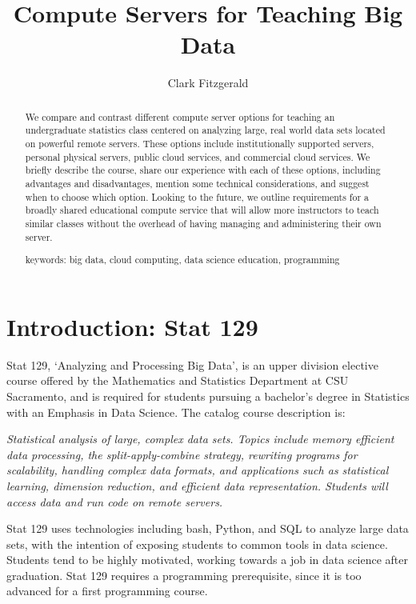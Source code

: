 \documentclass[12pt]{article}
\title{Compute Servers for Teaching Big Data}
\author{Clark Fitzgerald}
\begin{document}
\maketitle

\begin{abstract}

    We compare and contrast different compute server options for teaching an undergraduate statistics class centered on analyzing large, real world data sets located on powerful remote servers.
These options include institutionally supported servers, personal physical servers, public cloud services, and commercial cloud services.
We briefly describe the course, share our experience with each of these options, including advantages and disadvantages, mention some technical considerations, and suggest when to choose which option.
Looking to the future, we outline requirements for a broadly shared educational compute service that will allow more instructors to teach similar classes without the overhead of having managing and administering their own server.

\vspace{0.5in}
keywords: big data, cloud computing, data science education, programming

\end{abstract}



\section{Introduction: Stat 129}

Stat 129, `Analyzing and Processing Big Data', is an upper division elective course offered by the Mathematics and Statistics Department at CSU Sacramento, and is required for students pursuing a bachelor's degree in Statistics with an Emphasis in Data Science.
The catalog course description is:

\emph{
Statistical analysis of large, complex data sets. Topics include memory efficient data processing, the split-apply-combine strategy, rewriting programs for scalability, handling complex data formats, and applications such as statistical learning, dimension reduction, and efficient data representation. Students will access data and run code on remote servers.
}

Stat 129 uses technologies including bash, Python, and SQL to analyze large data sets, with the intention of exposing students to common tools in data science.
Students tend to be highly motivated, working towards a job in data science after graduation.
Stat 129 requires a programming prerequisite, since it is too advanced for a first programming course.
\end{document}
